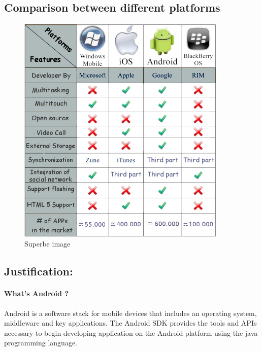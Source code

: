 \newpage
\subsection{Comparison between different platforms}

\begin{figure}[!h]
    \begin{center}
    \includegraphics[width=10cm]{./images/mobile/compare}
    \caption{Superbe image}
    \end{center}

\end{figure}
\subsection{Justification:}

\paragraph{What's Android ?}

Android is a software stack for mobile devices that includes an operating system, middleware and key applications. The Android SDK provides the tools
and APIs necessary to begin developing application on the Android platform using the java programming language.

